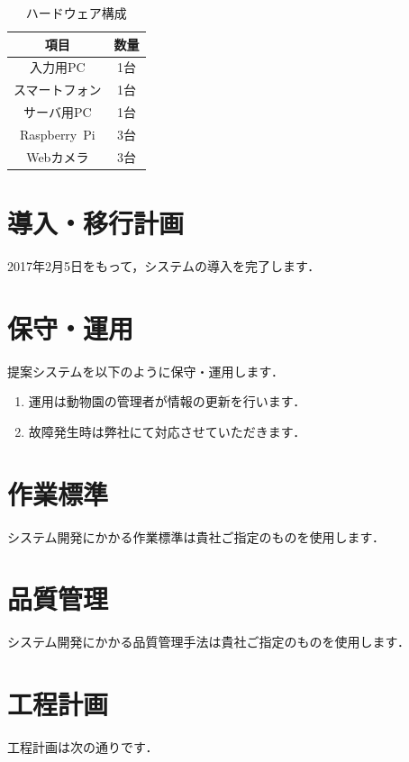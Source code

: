 \documentclass[a4j]{jarticle}
\begin{document}
\begin{table}[H]
	\caption{ハードウェア構成}
	\begin{center}
 	  \begin{tabular}{|c|c|}\hline
            		項目 & 数量 \\ \hline
			入力用PC & 1台 \\ \hline
			スマートフォン & 1台 \\ \hline
			サーバ用PC & 1台 \\ \hline
			Raspberry~Pi & 3台 \\ \hline
			Webカメラ & 3台\\ \hline
		\end{tabular}
		\label{hardware}
	\end{center}
\end{table}



\section{導入・移行計画}
2017年2月5日をもって，システムの導入を完了します．

\section{保守・運用}
提案システムを以下のように保守・運用します．

\begin{enumerate}
	\item 運用は動物園の管理者が情報の更新を行います．
	\item 故障発生時は弊社にて対応させていただきます．
\end{enumerate}

\section{作業標準}
システム開発にかかる作業標準は貴社ご指定のものを使用します．

\section{品質管理}
システム開発にかかる品質管理手法は貴社ご指定のものを使用します．

\section{工程計画}
工程計画は次の通りです．\\
\end{document}
